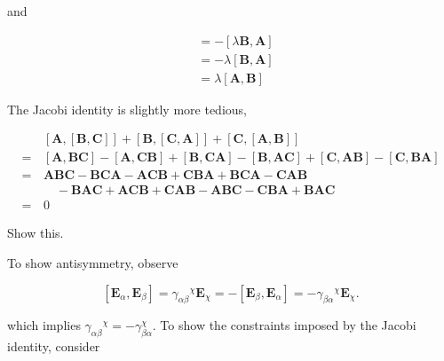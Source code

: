 \documentclass[../the-road-to-reality.tex]{subfiles}
\begin{document}
\begin{questions}
\begin{solution}
        and

        \begin{align*}
                [\mathbf{A}, \lambda\mathbf{B}] &= -[\lambda\mathbf{B}, \mathbf{A}] \\
                &= -\lambda[\mathbf{B}, \mathbf{A}] \\
                &= \lambda[\mathbf{A}, \mathbf{B}]
        \end{align*}

        The Jacobi identity is slightly more tedious,

        \begin{align*}
                &[\mathbf{A},[\mathbf{B},\mathbf{C}]] + [\mathbf{B},[\mathbf{C},\mathbf{A}]] + [\mathbf{C},[\mathbf{A},\mathbf{B}]] \\
                =\,&[\mathbf{A},\mathbf{BC}] - [\mathbf{A},\mathbf{CB}] + [\mathbf{B},\mathbf{CA}] - [\mathbf{B},\mathbf{AC}] + [\mathbf{C},\mathbf{AB}] - [\mathbf{C},\mathbf{BA}] \\
                =\,&\mathbf{ABC} - \mathbf{BCA} - \mathbf{ACB} + \mathbf{CBA} + \mathbf{BCA} - \mathbf{CAB} \\
                   &\quad- \mathbf{BAC} + \mathbf{ACB} + \mathbf{CAB} - \mathbf{ABC} - \mathbf{CBA} + \mathbf{BAC} \\
                =\,&0
        \end{align*}
\end{solution}

\question Show this.

\begin{solution}
        To show antisymmetry, observe

	\[
        [\mathbf{E}_\alpha, \mathbf{E}_\beta] = {\gamma_{\alpha\beta}}^\chi\mathbf{E}_\chi = -[\mathbf{E}_\beta, \mathbf{E}_\alpha] = -{\gamma_{\beta\alpha}}^\chi\mathbf{E}_\chi
	.\] 

        which implies ${\gamma_{\alpha\beta}}^\chi = -{\gamma_{\beta\alpha}^\chi}$. To show the constraints imposed by the Jacobi identity, consider


\end{solution}
\end{questions}
\end{document}

